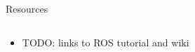 \documentclass{beamer}
\begin{document}

\begin{frame}{Resources}
  \begin{columns}
	\begin{column}{0.6\textwidth}
	  \begin{itemize}
		\item TODO: links to ROS tutorial and wiki
	  \end{itemize}
	\end{column}
  \begin{column}{0.4\textwidth}
		\centering
	\end{column}
  \end{columns}
\end{frame}


\end{document}
